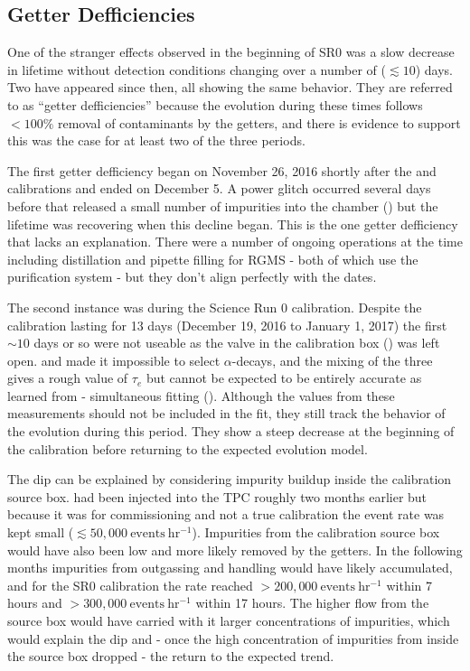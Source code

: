 \subsection{Getter Defficiencies}
\label{subsec:electron_lifetime_model_detector_effects_getter}
One of the stranger effects observed in the beginning of SR0 was a slow decrease in lifetime without detection conditions
changing over a number of ($\lesssim 10$) days.  Two have appeared since then, all showing the same behavior.  They are referred to as
``getter defficiencies'' because the evolution during these times follows $< 100\%$ removal of
contaminants by the getters, and there is evidence to support this was the case for at least two of the three periods.

The first getter defficiency
began on November 26, 2016 shortly after the \ambe and \metakr calibrations and ended on December 5.  A power glitch occurred several
days before that released a small number of impurities into the chamber
() but the lifetime was recovering when this decline
began.  This is the one getter defficiency that lacks an explanation.  There were a number of ongoing operations
at the time including  distillation and pipette filling for RGMS - both of which use the purification system - but they don't
align perfectly with the dates.

The second instance was during the Science Run 0  calibration.  Despite the calibration lasting for 13 days
(December 19, 2016 to January 1, 2017) the first ${\sim} 10$ days or
so were not useable as the valve in the calibration box () was left
open.   and  made it impossible to select  $\alpha$-decays, and the mixing of the three gives a
rough
value of $\tau_e$ but cannot be expected to be entirely accurate as learned from \rnbkg- simultaneous fitting
().  Although the values from these measurements should not be included in the
fit, they still track the behavior of the evolution during this period.  They show a steep decrease at the beginning of the calibration
before returning to the expected evolution model.

The dip can be explained by considering impurity buildup inside the calibration source box.   had been injected into the TPC
roughly two months earlier but because it was for commissioning and not a true calibration the event rate was kept small
($\lesssim 50,000\ \mathrm{events\ hr^{-1}}$).  Impurities from the calibration source box would have also been low and more likely
removed by the getters.  In the following months
impurities from outgassing and handling would have likely accumulated, and for the SR0 calibration the rate reached
$> 200,000\ \mathrm{events\ hr^{-1}}$ within 7 hours and $> 300,000\ \mathrm{events\ hr^{-1}}$ within 17 hours.  The higher flow from
the source box would have carried with it larger concentrations of impurities, which would explain the
dip and - once the high concentration of impurities from inside the source box dropped - the return to the expected trend.

